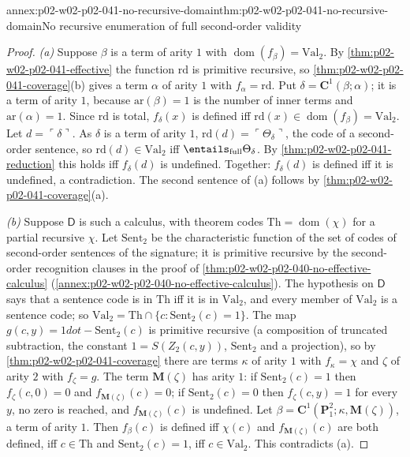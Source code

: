 \begin{annexitem}{annex:p02-w02-p02-041-no-recursive-domain}{thm:p02-w02-p02-041-no-recursive-domain}{No recursive enumeration of full second-order validity}
\begin{proof}
\emph{(a)}  Suppose \(\beta\) is a term of arity \(1\) with
\(\operatorname{dom}(f_\beta)=\mathrm{Val}_2\).  By
\cref{thm:p02-w02-p02-041-effective} the function \(\mathrm{rd}\) is
primitive recursive, so \cref{thm:p02-w02-p02-041-coverage}(b) gives a term
\(\alpha\) of arity \(1\) with \(f_\alpha=\mathrm{rd}\).  Put
\(\delta=\mathbf C^1(\beta;\alpha)\); it is a term of arity \(1\), because
\(\mathrm{ar}(\beta)=1\) is the number of inner terms and
\(\mathrm{ar}(\alpha)=1\).  Since \(\mathrm{rd}\) is total,
\(f_\delta(x)\) is defined iff \(\mathrm{rd}(x)\in\operatorname{dom}(f_\beta)=\mathrm{Val}_2\).
Let \(d=\ulcorner\delta\urcorner\).  As \(\delta\) is a term of arity \(1\),
\(\mathrm{rd}(d)=\ulcorner\Theta_\delta\urcorner\), the code of a second-order
sentence, so \(\mathrm{rd}(d)\in\mathrm{Val}_2\) iff
\(\entails_{\mathrm{full}}\Theta_\delta\).  By
\cref{thm:p02-w02-p02-041-reduction} this holds iff \(f_\delta(d)\) is
undefined.  Together: \(f_\delta(d)\) is defined iff it is undefined, a
contradiction.  The second sentence of (a) follows by
\cref{thm:p02-w02-p02-041-coverage}(a).

\emph{(b)}  Suppose \(\mathsf D\) is such a calculus, with theorem codes
\(\mathrm{Th}=\operatorname{dom}(\chi)\) for a partial recursive \(\chi\).  Let
\(\mathrm{Sent}_2\) be the characteristic function of the set of codes of
second-order sentences of the signature; it is primitive recursive by the
second-order recognition clauses in the proof of
\cref{thm:p02-w02-p02-040-no-effective-calculus}
(\cref{annex:p02-w02-p02-040-no-effective-calculus}).  The hypothesis on
\(\mathsf D\) says that a sentence code is in \(\mathrm{Th}\) iff it is in
\(\mathrm{Val}_2\), and every member of \(\mathrm{Val}_2\) is a sentence code;
so \(\mathrm{Val}_2=\mathrm{Th}\cap\{c:\mathrm{Sent}_2(c)=1\}\).  The map
\(g(c,y)=1\mathbin{dot{-}}\mathrm{Sent}_2(c)\) is primitive recursive (a composition
of truncated subtraction, the constant \(1=S(Z_2(c,y))\), \(\mathrm{Sent}_2\)
and a projection), so by \cref{thm:p02-w02-p02-041-coverage} there are terms
\(\kappa\) of arity \(1\) with \(f_\kappa=\chi\) and \(\zeta\) of arity \(2\)
with \(f_\zeta=g\).  The term \(\mathbf M(\zeta)\) has arity \(1\):
if \(\mathrm{Sent}_2(c)=1\) then \(f_\zeta(c,0)=0\) and
\(f_{\mathbf M(\zeta)}(c)=0\); if \(\mathrm{Sent}_2(c)=0\) then
\(f_\zeta(c,y)=1\) for every \(y\), no zero is reached, and
\(f_{\mathbf M(\zeta)}(c)\) is undefined.  Let
\(\beta=\mathbf C^1(\mathbf P^2_1;\kappa,\mathbf M(\zeta))\), a term of arity
\(1\).  Then \(f_\beta(c)\) is defined iff \(\chi(c)\) and
\(f_{\mathbf M(\zeta)}(c)\) are both defined, iff
\(c\in\mathrm{Th}\) and \(\mathrm{Sent}_2(c)=1\), iff \(c\in\mathrm{Val}_2\).
This contradicts (a).


\end{proof}
\end{annexitem}
